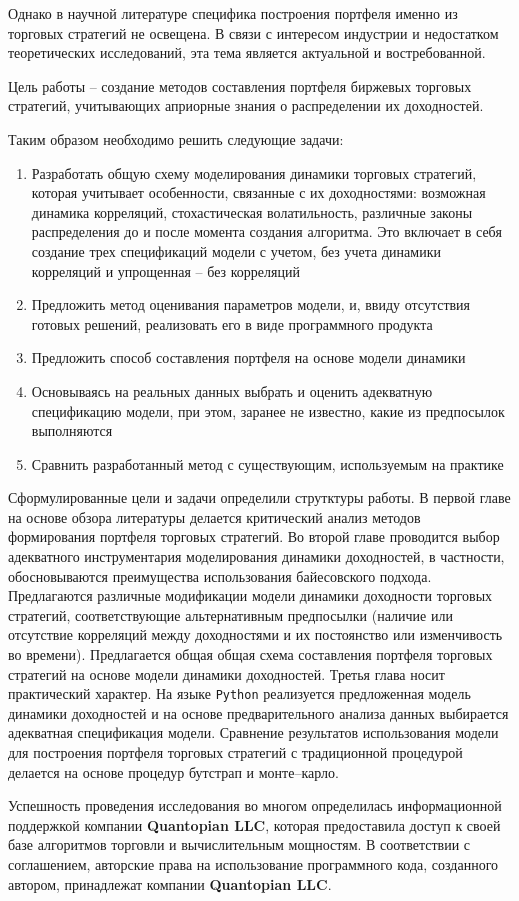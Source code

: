 Однако в научной литературе специфика построения портфеля именно из торговых стратегий не освещена. В связи с интересом индустрии и недостатком теоретических исследований, эта тема является актуальной и востребованной.

Цель работы -- создание методов составления портфеля биржевых торговых стратегий, учитывающих априорные знания о распределении их доходностей.

Таким образом необходимо решить следующие задачи:
\begin{enumerate}
	\item Разработать общую схему моделирования динамики торговых стратегий, которая учитывает особенности, связанные с их доходностями: возможная динамика корреляций, стохастическая волатильность, различные законы распределения до и после момента создания алгоритма. Это включает в себя создание трех спецификаций модели с учетом, без учета динамики корреляций и упрощенная -- без корреляций
	\item Предложить метод оценивания параметров модели, и, ввиду отсутствия готовых решений, реализовать его в виде программного продукта
	\item Предложить способ составления портфеля на основе модели динамики
	\item Основываясь на реальных данных выбрать и оценить адекватную спецификацию модели, при этом, заранее не известно, какие из предпосылок выполняются
	\item Сравнить разработанный метод с существующим, используемым на практике
\end{enumerate}

Сформулированные цели и задачи определили струтктуры работы. В первой главе на основе обзора литературы делается критический анализ методов формирования портфеля торговых стратегий.
Во второй главе проводится выбор адекватного инструментария моделирования динамики доходностей, в частности, обосновываются преимущества использования байесовского подхода. Предлагаются различные модификации модели динамики доходности торговых стратегий, соответствующие альтернативным предпосылки (наличие или отсутствие корреляций между доходностями и их постоянство или изменчивость во времени). Предлагается общая общая схема составления портфеля торговых стратегий на основе модели динамики доходностей.
Третья глава носит практический характер. На языке \texttt{Python} реализуется предложенная модель динамики доходностей и на основе предварительного анализа данных выбирается адекватная спецификация модели. Сравнение результатов использования модели  для построения портфеля торговых стратегий с традиционной процедурой делается на основе процедур бутстрап и монте--карло.

Успешность проведения исследования во многом определилась информационной поддержкой компании \textbf{Quantopian LLC}, которая предоставила доступ к своей базе алгоритмов торговли и вычислительным мощностям. В соответствии с соглашением, авторские права на использование программного кода, созданного автором, принадлежат компании \textbf{Quantopian LLC}.
